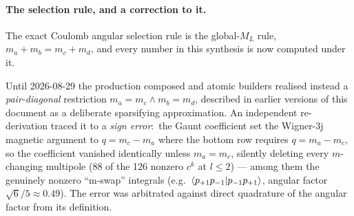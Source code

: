\documentclass[aps,pra,twocolumn,superscriptaddress,longbibliography]{revtex4-2}
\begin{document}
\paragraph{The selection rule, and a correction to it.}
The exact Coulomb angular selection rule is the global-$M_L$ rule,
$m_a+m_b=m_c+m_d$, and every number in this synthesis is now computed
under it.

Until 2026-08-29 the production composed and atomic builders realised
instead a \emph{pair-diagonal} restriction $m_a=m_c \wedge m_b=m_d$,
described in earlier versions of this document as a deliberate sparsifying
approximation.  An independent re-derivation traced it to a \emph{sign
error}:\ the Gaunt coefficient set the Wigner-3j magnetic argument to
$q = m_c-m_a$ where the bottom row requires $q = m_a-m_c$, so the
coefficient vanished identically unless $m_a=m_c$, silently deleting every
$m$-changing multipole (88 of the 126 nonzero $c^k$ at $l\le2$) --- among
them the genuinely nonzero ``m-swap'' integrals
(e.g.\ $\braket{p_{+1}p_{-1}|p_{-1}p_{+1}}$, angular factor
$\sqrt{6}/5 \approx 0.49$).  The error was arbitrated against direct
quadrature of the angular factor from its definition.
\end{document}
